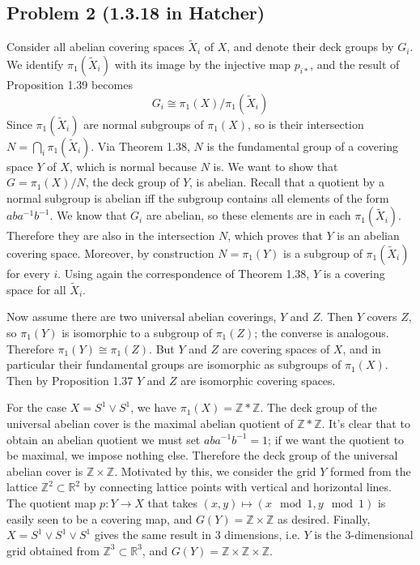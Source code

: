 \documentclass[12 pt]{article}
\newcommand{\R}{\mathbb{R}}
\newcommand{\Z}{\mathbb{Z}}
\begin{document}
\subsection*{Problem 2 (1.3.18 in Hatcher)}
Consider all abelian covering spaces $\tilde X_i$ of $X$, and denote their deck groups by $G_i$. We identify
$\pi_1(\tilde X_i)$ with its image by the injective map $p_{i*}$, and the result of Proposition 1.39 becomes
\[      G_i \cong \pi_1(X) / \pi_1(\tilde X_i)     \]
Since $\pi_1(\tilde X_i)$ are normal subgroups of $\pi_1(X)$, so is their intersection $N= \bigcap_i \pi_1(\tilde X_i)$.
Via Theorem 1.38, $N$ is the fundamental group of a covering space $Y$ of $X$, which is normal because $N$
is. We want to show that $G = \pi_1(X) /N$, the deck group of $Y$, is abelian. Recall that a quotient by a 
normal subgroup is abelian iff the subgroup contains all elements of the form $aba^{-1}b^{-1}$. We know that $G_i$
are abelian, so these elements are in each $\pi_1(\tilde X_i)$. Therefore they are also in the intersection $N$, which
proves that $Y$ is an abelian covering space. Moreover, by construction $N = \pi_1(Y)$ is a subgroup of 
$\pi_1(\tilde X_i)$ for every $i$. Using again the correspondence of Theorem 1.38, $Y$ is a covering space for
all $\tilde X_i$.

Now assume there are two universal abelian coverings, $Y$ and $Z$. Then $Y$ covers $Z$, so $\pi_1(Y)$ is isomorphic
to a subgroup of $\pi_1(Z)$; the converse is analogous. Therefore $\pi_1(Y) \cong \pi_1(Z)$. But $Y$ and $Z$ are
covering spaces of $X$, and in particular their fundamental groups are isomorphic as subgroups of $\pi_1(X)$.
Then by Proposition 1.37 $Y$ and $Z$ are isomorphic covering spaces.

For the case $X = S^1 \vee S^1$, we have $\pi_1(X) = \Z * \Z$. The deck group of the universal abelian cover
is the maximal abelian quotient of $\Z * \Z$. It's clear that to obtain an abelian quotient we must set
$aba^{-1}b^{-1} = 1$; if we want the quotient to be maximal, we impose nothing else. Therefore the deck group
of the universal abelian cover is $\Z \times \Z$. Motivated by this, we consider the grid $Y$ formed from the lattice
$\Z^2 \subset \R^2$ by connecting lattice points with vertical and horizontal lines. The quotient map $p:Y \to X$
that takes $(x,y) \mapsto (x \mod 1, y \mod 1)$ is easily seen to be a covering map, and $G(Y) = \Z \times \Z$ as
desired. Finally, $X = S^1 \vee S^1 \vee S^1$ gives the same result in 3 dimensions, i.e. $Y$ is the 3-dimensional
grid obtained from $\Z^3\subset \R^3$, and $G(Y) = \Z \times \Z \times \Z$.
\end{document}
